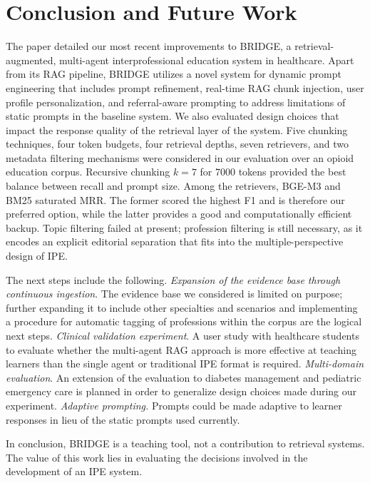 \documentclass[pdflatex,sn-mathphys-num]{sn-jnl}
\theoremstyle{thmstyleone}
\theoremstyle{thmstyletwo}
\theoremstyle{thmstylethree}
\begin{document}
\section{Conclusion and Future Work}\label{sec:conclusion}

The paper detailed our most recent improvements to BRIDGE, a retrieval-augmented, multi-agent interprofessional education system in healthcare. Apart from its RAG pipeline, BRIDGE utilizes a novel system for dynamic prompt engineering that includes prompt refinement, real-time RAG chunk injection, user profile personalization, and
referral-aware prompting to address limitations of static prompts in the baseline system. We also evaluated design choices that impact the response quality of the retrieval layer of the system. Five chunking techniques, four token budgets, four retrieval depths, seven retrievers, and two metadata filtering mechanisms were considered in our evaluation over an opioid education corpus. Recursive chunking $k=7$ for 7000 tokens provided the best balance between recall and prompt size. Among the retrievers, BGE-M3 and BM25 saturated MRR. The former scored the highest F1
and is therefore our preferred option, while the latter provides a good and computationally efficient backup. Topic filtering failed at present; profession filtering is still necessary, as it encodes an explicit editorial separation that fits into the multiple-perspective design of IPE.

The next steps include the following. \textit{Expansion of the evidence base through continuous ingestion}. The evidence base we considered is limited on purpose; further expanding it to include other specialties and scenarios and implementing a procedure for automatic tagging of professions within the corpus are the logical next steps. \textit{Clinical validation experiment}. A user study with healthcare students to evaluate whether the multi-agent RAG approach is more effective at teaching learners than the single agent or traditional IPE format is required. \textit{Multi-domain evaluation}. An extension of the evaluation to diabetes management and pediatric emergency care is planned in order to generalize design choices made during our experiment. \textit{Adaptive prompting.} Prompts could be made adaptive to learner responses in lieu of the static prompts used currently.

In conclusion, BRIDGE is a teaching tool, not a contribution to retrieval systems. The value of this work lies in evaluating the decisions involved in the development of an IPE system.
\end{document}
